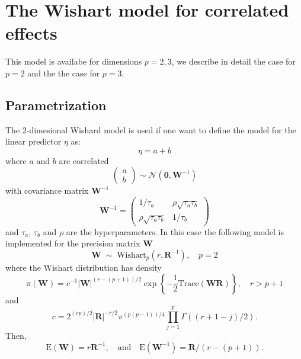 \documentclass[a4paper,11pt]{article}
\begin{document}
\section*{The Wishart model for correlated effects}

This model is availabe for dimensions $p=2,3$, we describe in detail
the case for $p=2$ and the the case for $p=3$.

\subsection*{Parametrization}

The 2-dimesional Wishard model is used if one want to define the model
for the linear predictor $\eta$ as:
\[
\eta=a+b
\]
where $a$ and $b$ are correlated
\[
\left(
  \begin{array}{c}
      a\\
      b
  \end{array}\right)
\sim \mathcal{N}\left(\mathbf{0}, \mathbf{W}^{-1}\right)
\]
with covariance matrix $\mathbf{W}^{-1}$
\begin{equation}
    \label{precision}
    \mathbf{W}^{-1} = \left(\begin{array}{cc}
          1/\tau_a & \rho \sqrt{\tau_a\tau_b}\\
          \rho\sqrt{\tau_a\tau_b}&  1/\tau_b
      \end{array}\right)
\end{equation}
and $\tau_{a}$, $\tau_{b}$ and $\rho$ are the hyperparameters. In this
case the following model is implemented for the precision matrix
$\mathbf{W}$
\begin{displaymath}
    \mathbf{W}
    \;\sim\;\text{Wishart}_{p}(r, \mathbf{R}^{-1}), \quad p=2
\end{displaymath}
where the Wishart distribution has density
\begin{displaymath}
    \pi(\mathbf{W}) = c^{-1} |\mathbf{W}|^{(r-(p+1))/2} \exp\left\{
      -\frac{1}{2}\text{Trace}(\mathbf{W}\mathbf{R})\right\}, \quad r > p+1
\end{displaymath}
and
\begin{displaymath}
    c = 2^{(rp)/2} |\mathbf{R}|^{-r/2} \pi^{(p(p-1))/4}\prod_{j=1}^{p} \Gamma((r+1-j)/2).
\end{displaymath}
Then,
\begin{displaymath}
    \text{E}(\mathbf{W}) = r\mathbf{R}^{-1}, \quad\text{and}\quad
    \text{E}(\mathbf{W}^{-1}) = \mathbf{R}/(r-(p+1)).
\end{displaymath}
\end{document}
